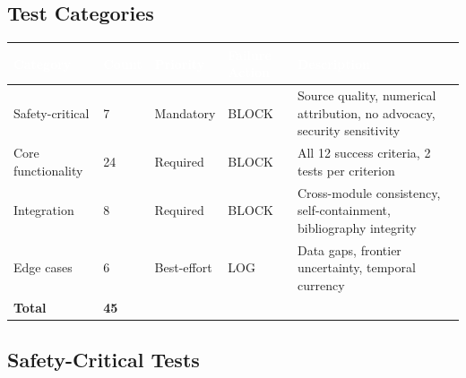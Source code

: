 \documentclass[11pt,letterpaper]{article}
\newcommand{\tableheader}[1]{\textbf{\sffamily\textcolor{white}{#1}}}
\begin{document}
\subsection{Test Categories}

\begin{center}
\begin{tabularx}{\textwidth}{L{3cm}C{1.5cm}C{2cm}C{2cm}X}
\toprule
{}
\tableheader{Category} & \tableheader{Count} & \tableheader{Priority} & \tableheader{Failure Action} & \tableheader{Description} \\
\midrule
Safety-critical & 7 & Mandatory & BLOCK & Source quality, numerical attribution, no advocacy, security sensitivity \\
Core functionality & 24 & Required & BLOCK & All 12 success criteria, 2 tests per criterion \\
Integration & 8 & Required & BLOCK & Cross-module consistency, self-containment, bibliography integrity \\
Edge cases & 6 & Best-effort & LOG & Data gaps, frontier uncertainty, temporal currency \\
\midrule
\textbf{Total} & \textbf{45} & & & \\
\bottomrule
\end{tabularx}
\end{center}

\subsection{Safety-Critical Tests}
\end{document}
